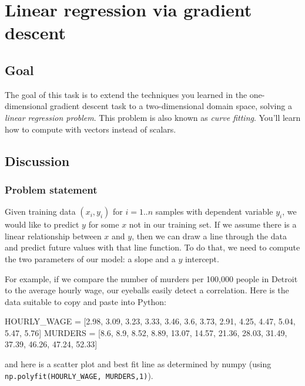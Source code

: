 \chapter{Linear regression via gradient descent}

\section{Goal}

\begin{fullwidth}

The goal of this task is to extend the techniques you learned in the one-dimensional gradient descent task to a two-dimensional domain space, solving a {\em linear regression problem}.  This problem is also known as {\em curve fitting}. You'll learn how to compute with vectors instead of scalars.

\section{Discussion}

\subsection{Problem statement}

Given training data $(x_i, y_i)$ for $i=1..n$ samples with dependent variable $y_i$, we would like to predict $y$ for some $x$ not in our training set. If we assume there is a linear relationship between $x$ and $y$, then we can draw a line through the data and predict future values with that line function. To do that, we need to compute the two parameters of our model: a slope and a $y$ intercept. 

For example, if we compare the number of murders per 100,000 people in Detroit to the average hourly wage, our eyeballs easily detect a correlation.  Here is the data suitable to copy and paste into Python:

\begin{pyverbatim}
HOURLY_WAGE = [2.98, 3.09, 3.23, 3.33, 3.46, 3.6, 3.73, 2.91, 4.25, 4.47, 5.04, 5.47, 5.76]
MURDERS = [8.6, 8.9, 8.52, 8.89, 13.07, 14.57, 21.36, 28.03, 31.49, 37.39, 46.26, 47.24, 52.33]
\end{pyverbatim}

\noindent and here is a scatter plot and best fit line as determined by numpy (using {\tt\footnotesize np.polyfit(HOURLY\_WAGE, MURDERS,1)}).

\\


\end{fullwidth}
